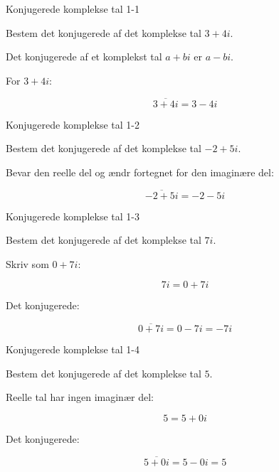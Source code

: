 \documentclass{article}
\begin{document}

\tableofcontents
\newpage

\begin{exercise}{Konjugerede komplekse tal 1-1}

Bestem det konjugerede af det komplekse tal $3 + 4i$.


\hint

Det konjugerede af et komplekst tal $a + bi$ er $a - bi$.

\hint

For $3 + 4i$:

\hint
\[
\overline{3 + 4i} = 3 - 4i
\]

\end{exercise}

\newpage

\begin{exercise}{Konjugerede komplekse tal 1-2}

Bestem det konjugerede af det komplekse tal $-2 + 5i$.


\hint

Bevar den reelle del og ændr fortegnet for den imaginære del:

\hint
\[
\overline{-2 + 5i} = -2 - 5i
\]

\end{exercise}

\newpage

\begin{exercise}{Konjugerede komplekse tal 1-3}

Bestem det konjugerede af det komplekse tal $7i$.


\hint

Skriv som $0 + 7i$:

\hint
\[
7i = 0 + 7i
\]

\hint

Det konjugerede:

\hint
\[
\overline{0 + 7i} = 0 - 7i = -7i
\]

\end{exercise}

\newpage

\begin{exercise}{Konjugerede komplekse tal 1-4}

Bestem det konjugerede af det komplekse tal $5$.


\hint

Reelle tal har ingen imaginær del:

\hint
\[
5 = 5 + 0i
\]

\hint

Det konjugerede:

\hint
\[
\overline{5 + 0i} = 5 - 0i = 5
\]

\end{exercise}
\end{document}
